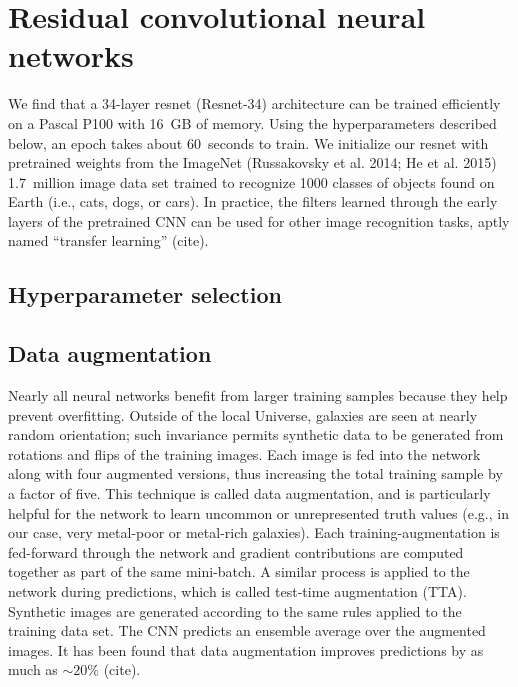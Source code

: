 \documentclass[fleqn,usenatbib]{mnras}
\begin{document}


\appendix
%
\section{Residual convolutional neural networks}
%



We find that a 34-layer resnet (Resnet-34) architecture can be trained efficiently on a Pascal P100 with 16~GB of memory.
Using the hyperparameters described below, an epoch takes about 60~seconds to train.
We initialize our resnet with pretrained weights from the ImageNet (Russakovsky et al. 2014; He et al. 2015) 1.7~million image data set trained to recognize 1000 classes of objects found on Earth (i.e., cats, dogs, or cars).
In practice, the filters learned through the early layers of the pretrained CNN can be used for other image recognition tasks, aptly named ``transfer learning'' (cite).


\subsection{Hyperparameter selection}

\subsection{Data augmentation}
Nearly all neural networks benefit from larger training samples because they help prevent overfitting.
Outside of the local Universe, galaxies are seen at nearly random orientation; such invariance permits synthetic data to be generated from rotations and flips of the training images.
Each image is fed into the network along with four augmented versions, thus increasing the total training sample by a factor of five.
This technique is called data augmentation, and is particularly helpful for the network to learn uncommon or unrepresented truth values (e.g., in our case, very metal-poor or metal-rich galaxies).
Each training-augmentation is fed-forward through the network and gradient contributions are computed together as part of the same mini-batch.
A similar process is applied to the network during predictions, which is called test-time augmentation (TTA).
Synthetic images are generated according to the same rules applied to the training data set. 
The CNN predicts an ensemble average over the augmented images.
It has been found that data augmentation improves predictions by as much as $\sim 20\%$ (cite).
\end{document}
